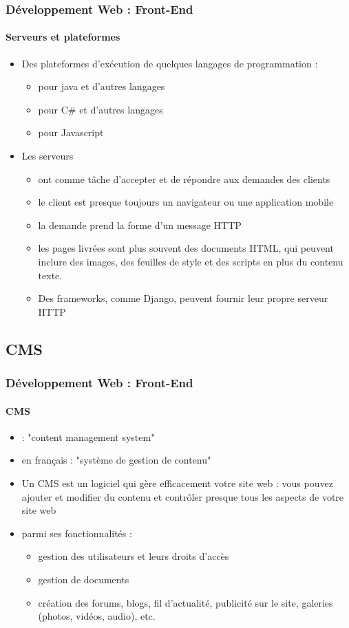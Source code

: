\documentclass[xcolor=table]{beamer}
\begin{document}
\begin{frame}
\frametitle{Développement Web : Front-End}
\framesubtitle{Serveurs et plateformes}

\begin{itemize}
	\item Des plateformes d'exécution de quelques langages de programmation :
	\begin{itemize}
		\item {} pour java et d'autres langages
		\item {} pour C\# et d'autres langages 
		\item {} pour Javascript
	\end{itemize}
	\item Les serveurs
	\begin{itemize}
		\item ont comme tâche d'accepter et de répondre aux demandes des clients
		\item le client est presque toujours un navigateur ou une application mobile
		\item la demande prend la forme d'un message HTTP
		\item les pages livrées sont plus souvent des documents HTML, qui peuvent inclure des images, des feuilles de style et des scripts en plus du contenu texte.
		\item Des frameworks, comme Django, peuvent fournir leur propre serveur HTTP
	\end{itemize}
\end{itemize}

\end{frame}

\subsection{CMS}

\begin{frame}
\frametitle{Développement Web : Front-End}
\framesubtitle{CMS}

\begin{itemize}
	\item {} : "content management system"
	\item en français : "système de gestion de contenu"
	\item Un CMS est un logiciel qui gère efficacement votre site web : vous pouvez ajouter et modifier du contenu et contrôler presque tous les aspects de votre site web
	\item parmi ses fonctionnalités : 
	\begin{itemize}
		\item gestion des utilisateurs et leurs droits d'accès 
		\item gestion de documents
		\item création des forums, blogs, fil d'actualité, publicité sur le site, galeries (photos, vidéos, audio), etc.
	\end{itemize}
\end{itemize}

\end{frame}
\end{document}
